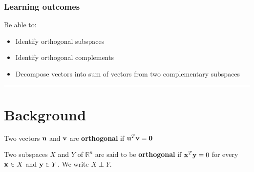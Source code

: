  





\subsubsection*{Learning outcomes}
Be able to:
\begin{itemize}
	\item Identify orthogonal subspaces
	\item Identify orthogonal complements
	\item Decompose vectors into sum of vectors from two complementary subspaces
	
\end{itemize}





\rule[0.01in]{\textwidth}{0.0025in}


%
%
\section{Background}

 \begin{tcolorbox}[colback=yellow!10!,colframe=gray!15!]
 \begin{definition}[Orthogonal]
 Two vectors ${\bf u}$ and ${\bf v}$ are \textbf{orthogonal} if ${\bf u}^T {\bf v} = {\bf 0}$
 \end{definition}	 
 \end{tcolorbox} 







 \begin{tcolorbox}[colback=yellow!10!,colframe=gray!15!]
 \begin{definition}
 Two subspaces $X$ and $Y$ of $\mathbb{R}^n$ are said to be \textbf{orthogonal} if ${\bf x}^T {\bf y} = { 0}$  for every ${\bf x} \in X$ and ${\bf y} \in Y$.   We write $X \perp Y$.
 \end{definition}	 
 \end{tcolorbox} 





